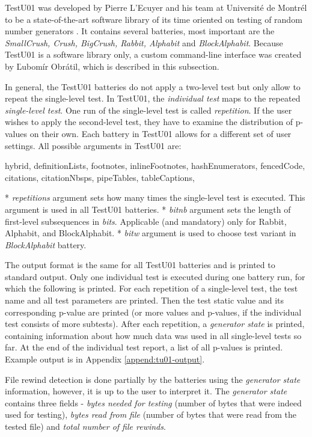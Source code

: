 \documentclass[
  digital,     %
  oneside,     %
  nosansbold,  %
  nocolorbold, %
  nolof,         %
  nolot,         %
]{fithesis4}
\begin{document}
TestU01 \cite{tu01_site} was developed by Pierre L'Ecuyer and his team at Université de Montrél to be a state-of-the-art software library of its time oriented on testing of random number generators \cite{tu01_paper}. It contains several batteries, most important are the \emph{SmallCrush, Crush, BigCrush, Rabbit, Alphabit} and \emph{BlockAlphabit}. Because TestU01 is a software library only, a custom command-line interface \cite{rtt-batteries} was created by Ľubomír Obrátil, which is described in this subsection.

In general, the TestU01 batteries do not apply a two-level test but only allow to repeat the single-level test. In TestU01, the \emph{individual test} maps to the repeated \emph{single-level test}. One run of the single-level test is called \emph{repetition}. If the user wishes to apply the second-level test, they have to examine the distribution of p-values on their own. Each battery in TestU01 allows for a different set of user settings. All possible arguments in TestU01 are:
\begin{markdown*}{%
  hybrid,
  definitionLists,
  footnotes,
  inlineFootnotes,
  hashEnumerators,
  fencedCode,
  citations,
  citationNbsps,
  pipeTables,
  tableCaptions,
}

* \emph{repetitions} argument sets how many times the single-level test is executed. This argument is used in all TestU01 batteries.
* \emph{bit\textunderscore nb} argument sets the length of first-level subsequences in \emph{bits}. Applicable (and mandatory) only for Rabbit, Alphabit, and BlockAlphabit.
* \emph{bit\textunderscore w} argument is used to choose test variant in \emph{BlockAlphabit} battery.
\end{markdown*}

The output format is the same for all TestU01 batteries and is printed to standard output. Only one individual test is executed during one battery run, for which the following is printed. For each repetition of a single-level test, the test name and all test parameters are printed. Then the test static value and its corresponding p-value are printed (or more values and p-values, if the individual test consists of more subtests). After each repetition, a \emph{generator state} is printed, containing information about how much data was used in all single-level tests so far. At the end of the individual test report, a list of all p-values is printed. Example output is in Appendix \ref{append:tu01-output}.

File rewind detection is done partially by the batteries using the \emph{generator state} information, however, it is up to the user to interpret it. The \emph{generator state} contains three fields - \emph{bytes needed for testing} (number of bytes that were indeed used for testing), \emph{bytes read from file} (number of bytes that were read from the tested file) and \emph{total number of file rewinds}. 
\end{document}
